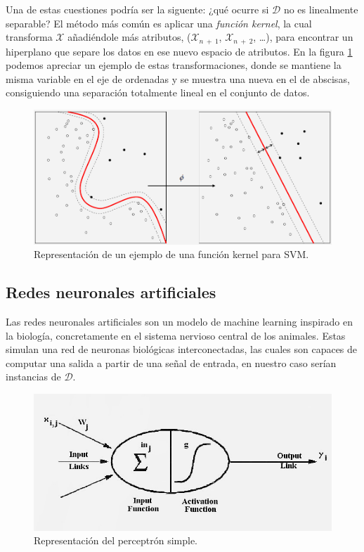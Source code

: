 Una de estas cuestiones podría ser la siguente: ¿qué ocurre si $\mathcal{D}$ no es linealmente separable? El método más común es aplicar una \emph{función kernel}, la cual transforma $\mathcal{X}$ añadiéndole más atributos, ($\mathcal{X}_{n\:+\:1}$, $\mathcal{X}_{n\:+\:2}$, \dots), para encontrar un hiperplano que separe los datos en ese nuevo espacio de atributos. En la figura \ref{fig:3.3} podemos apreciar un ejemplo de estas transformaciones, donde se mantiene la misma variable en el eje de ordenadas y se muestra una nueva en el de abscisas, consiguiendo una separación totalmente lineal en el conjunto de datos.

\begin{figure}[ht]
  \centering
  \includegraphics[width=120mm]{figures/ch_03/svm_kernel.png}
  \caption{Representación de un ejemplo de una función kernel para SVM. \cite{wikipedia2014support}}
  \label{fig:3.3}
\end{figure}

\subsection{Redes neuronales artificiales} \label{subsec:3.1.3}

Las redes neuronales artificiales son un modelo de machine learning inspirado en la biología, concretamente en el sistema nervioso central de los animales. Estas simulan una red de neuronas biológicas interconectadas, las cuales son capaces de computar una salida a partir de una señal de entrada, en nuestro caso serían instancias de $\mathcal{D}$.

\begin{figure}[ht]
  \centering
  \includegraphics[width=120mm]{figures/ch_03/perceptron_example.jpg}
  \caption{Representación del perceptrón simple. \cite{kendall2001introduction}}
  \label{fig:3.4}
\end{figure}

